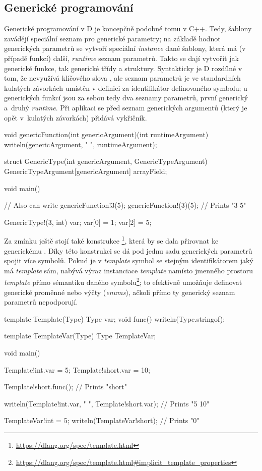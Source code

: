 \subsection{Generické programování}
Generické programování v D je koncepčně podobné tomu v C++. Tedy, šablony zavádějí speciální seznam pro generické parametry; na základě hodnot generických parametrů se vytvoří speciální \textit{instance} dané šablony, která má (v případě funkcí) další, \textit{runtime} seznam parametrů. Takto se dají vytvořit jak generické funkce, tak generické třídy a struktury. Syntakticky je D rozdílné v tom, že nevyužívá klíčového slova , ale seznam parametrů je ve standardních kulatých závorkách umístěn v definici za identifikátor definovaného symbolu; u generických funkcí jsou za sebou tedy dva seznamy parametrů, první generický a~druhý \textit{runtime}. Při aplikaci se před seznam generických argumentů (který je opět v~kulatých závorkách) přidává vykřičník.
\pagebreak
\begin{dcode}
void genericFunction(int genericArgument)(int runtimeArgument) {
	writeln(genericArgument, " ", runtimeArgument);
}

struct GenericType(int genericArgument, GenericTypeArgument) {
	GenericTypeArgument[genericArgument] arrayField;
}

void main() {
	// Also can write genericFunction!3(5);
	genericFunction!(3)(5); // Prints "3 5\n"
	
	GenericType!(3, int) var;
	var[0] = 1;
	var[2] = 5;
}
\end{dcode}

Za zmínku ještě stojí také konstrukce \footnote{\url{https://dlang.org/spec/template.html}}, která by se dala přirovnat ke generickému . Díky této konstrukci se dá pod jednu sadu generických parametrů spojit více symbolů. Pokud je v \textit{template} symbol se stejným identifikátorem jaký má \textit{template} sám, nabývá výraz instanciace \textit{template} namísto jmenného prostoru \textit{template} přímo sémantiku daného symbolu\footnote{\url{https://dlang.org/spec/template.html\#implicit_template_properties}}; to efektivně umožňuje definovat generické proměnné nebo výčty (\textit{enums}), ačkoli přímo ty generický seznam parametrů nepodporují.

\begin{dcode}
template Template(Type) {
	Type var;
	void func() {
		writeln(Type.stringof);
	}
}

template TemplateVar(Type) {
	Type TemplateVar;
}

void main() {
	Template!int.var = 5;
	Template!short.var = 10;
	
	Template!short.func(); // Prints "short\n"
	
	writeln(Template!int.var, " ", Template!short.var); // Prints "5 10\n"
	
	TemplateVar!int = 5;
	writeln(TemplateVar!short); // Prints "0\n"
}
\end{dcode}

